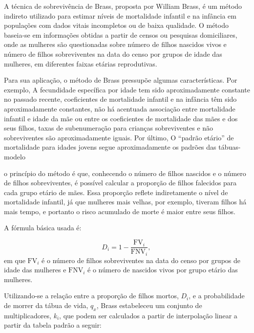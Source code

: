 \documentclass[
  12pt,
  a4paper,
]{scrreprt}
\begin{document}
A técnica de sobrevivência de Brass, proposta por William Brass, é um
método indireto utilizado para estimar níveis de mortalidade infantil e
na infância em populações com dados vitais incompletos ou de baixa
qualidade. O método baseia-se em informações obtidas a partir de censos
ou pesquisas domiciliares, onde as mulheres são questionadas sobre
número de filhos nascidos vivos e número de filhos sobreviventes na data
do censo por grupos de idade das mulheres, em diferentes faixas etárias
reprodutivas.

\vspace{12pt}

Para sua aplicação, o método de Brass pressupõe algumas características.
Por exemplo, A fecundidade específica por idade tem sido aproximadamente
constante no passado recente, coeficientes de mortalidade infantil e na
infância têm sido aproximadamente constantes, não há acentuada
associação entre mortalidade infantil e idade da mãe ou entre os
coeficientes de mortalidade das mães e dos seus filhos, taxas de
subenumeração para crianças sobreviventes e não sobreviventes são
aproximadamente iguais. Por último, O ``padrão etário'' de mortalidade
para idades jovens segue aproximadamente os padrões das tábuas-modelo

\vspace{12pt}

o princípio do método é que, conhecendo o número de filhos nascidos e o
número de filhos sobreviventes, é possível calcular a proporção de
filhos falecidos para cada grupo etário de mães. Essa proporção reflete
indiretamente o nível de mortalidade infantil, já que mulheres mais
velhas, por exemplo, tiveram filhos há mais tempo, e portanto o risco
acumulado de morte é maior entre seus filhos.

\vspace{12pt}

A fórmula básica usada é:

\[
D_i = 1 - \frac{\text{FV}_i}{\text{FNV}_i}\text{, }
\] em que \(\text{FV}_i\) é o número de filhos sobreviventes na data do
censo por grupos de idade das mulheres e \(\text{FNV}_i\) é o número de
nascidos vivos por grupo etário das mulheres.

\vspace{12pt}

Utilizando-se a relação entre a proporção de filhos mortos, \(D_i\), e a
probabilidade de morrer da tábua de vida, \(q_x\), Brass estabeleceu um
conjunto de multiplicadores, \(k_i\), que podem ser calculados a partir
de interpolação linear a partir da tabela padrão a seguir:
\end{document}
